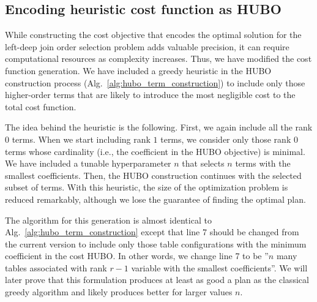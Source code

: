 \subsection{Encoding heuristic cost function as HUBO}\label{subsection:heuristic_cost_function}

While constructing the cost objective that encodes the optimal solution for the left-deep join order selection problem adds valuable precision, it can require computational resources as complexity increases. Thus, we have modified the cost function generation. We have included a greedy heuristic in the HUBO construction process (Alg.~\ref{alg:hubo_term_construction}) to include only those higher-order terms that are likely to introduce the most negligible cost to the total cost function.

The idea behind the heuristic is the following. First, we again include all the rank $0$ terms. When we start including rank $1$ terms, we consider only those rank $0$ terms whose cardinality (i.e., the coefficient in the HUBO objective) is minimal. We have included a tunable hyperparameter $n$ that selects $n$ terms with the smallest coefficients. Then, the HUBO construction continues with the selected subset of terms. With this heuristic, the size of the optimization problem is reduced remarkably, although we lose the guarantee of finding the optimal plan. 

The algorithm for this generation is almost identical to Alg.~\ref{alg:hubo_term_construction} except that line 7 should be changed from the current version to include only those table configurations with the minimum coefficient in the cost HUBO. In other words, we change line 7 to be ''$n$ many tables associated with rank $r - 1$ variable with the smallest coefficients''. We will later prove that this formulation produces at least as good a plan as the classical greedy algorithm and likely produces better for larger values $n$.